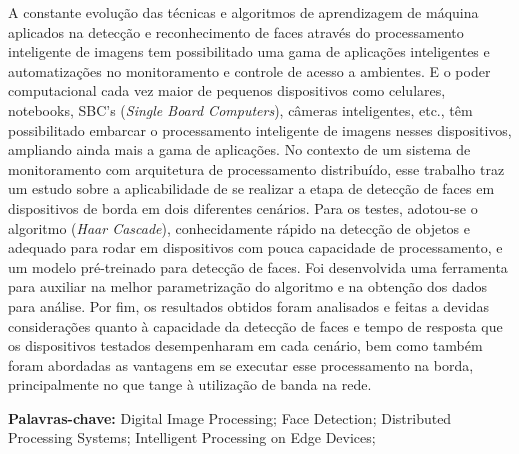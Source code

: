\begin{resumo}

A constante evolução das técnicas e algoritmos de aprendizagem de máquina aplicados na detecção e reconhecimento de faces através do processamento inteligente de imagens tem possibilitado uma gama de aplicações inteligentes e automatizações no monitoramento e controle de acesso a ambientes. E o poder computacional cada vez maior de pequenos dispositivos como celulares, notebooks, SBC's (\textit{Single Board Computers}), câmeras inteligentes, etc., têm possibilitado embarcar o processamento inteligente de imagens nesses dispositivos, ampliando ainda mais a gama de aplicações. No contexto de um sistema de monitoramento com arquitetura de processamento distribuído, esse trabalho traz um estudo sobre a aplicabilidade de se realizar a etapa de detecção de faces em dispositivos de borda em dois diferentes cenários. Para os testes, adotou-se o algoritmo (\textit{Haar Cascade}), conhecidamente rápido na detecção de objetos e adequado para rodar em dispositivos com pouca capacidade de processamento, e um modelo pré-treinado para detecção de faces. Foi desenvolvida uma ferramenta para auxiliar na melhor parametrização do algoritmo e na obtenção dos dados para análise. Por fim, os resultados obtidos foram analisados e feitas a devidas considerações quanto à capacidade da detecção de faces e tempo de resposta que os dispositivos testados desempenharam em cada cenário, bem como também foram abordadas as vantagens em se executar esse processamento na borda, principalmente no que tange à utilização de banda na rede. 

\vspace{0.5cm}
 
 \textbf{Palavras-chave:} Digital Image Processing; Face Detection; Distributed Processing Systems; Intelligent Processing on Edge Devices;
\end{resumo}